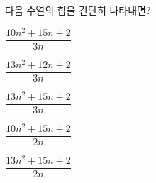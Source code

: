 \hspace*{2mm}\begin{minipage}[t]{\dimexpr\linewidth-2mm\relax}\vspace{0pt}
다음 수열의 합을 간단히 나타내면? 
\begin{choicesii}{\rule[-3ex]{0pt}{8ex}$\dfrac{10n^2+15n+2}{3n}$}{\rule[-3ex]{0pt}{8ex}$\dfrac{13n^2+12n+2}{3n}$}{\rule[-3ex]{0pt}{8ex}$\dfrac{13n^2+15n+2}{3n}$}{\rule[-3ex]{0pt}{8ex}$\dfrac{10n^2+15n+2}{2n}$}{\rule[-3ex]{0pt}{8ex}$\dfrac{13n^2+15n+2}{2n}$}\end{choicesii}\end{minipage}
